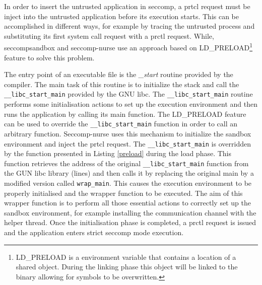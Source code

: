 In order to insert the untrusted application in seccomp, a prtcl request must be inject into the untrusted application before its execution starts. This can be accomplished in different ways, for example by tracing the untrusted process and substituting its first system call request with a prctl request. While, seccompsandbox and seccomp-nurse use an approach based on LD\_PRELOAD\footnote{LD\_PRELOAD is a environment variable that contains a location of a shared object. During the linking phase this object will be linked to the binary allowing for symbols to be overwritten.} feature to solve this problem. 


The entry point of an executable file is the \emph{\_start} routine provided by the compiler. The main task of this routine is to initialize the stack and call the \lstinline$__libc_start_main$  provided by the GNU libc. The \lstinline$__libc_start_main$ routine performs some initialisation actions to set up the execution environment and then runs the application by calling its main function. The LD\_PRELOAD feature can be used to override the \lstinline$__libc_start_main$ function in order to call an arbitrary function. Seccomp-nurse uses this mechanism to initialize the sandbox environment and inject the prtcl request. The \lstinline$__libc_start_main$ is overridden by the function presented in Listing \ref{preload} during the load phase. This function retrieves the address of the original \lstinline$__libc_start_main$ function from the GUN libc library (lines) and then calls it by replacing the original main by a modified version called \lstinline$wrap_main$. This causes the execution environment to be properly initialised and the wrapper function to be executed. The aim of this wrapper function is to perform all those essential actions to correctly set up the sandbox environment, for example installing the communication channel with the helper thread. Once the initialisation phase is completed, a prctl request is issued and the application enters strict seccomp mode execution.  

